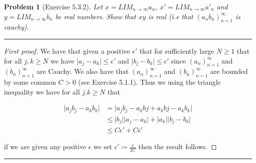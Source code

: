 \documentclass{article}
\newcommand{\lined}{\noindent\rule{\textwidth}{1pt}}
\newtheorem*{problem}{Problem}
\begin{document}
	\newpage
	
	\begin{problem}[Exercise 5.3.2]
		Let $x = LIM_{n \rightarrow \infty} a_n$, $x' = LIM_{n \rightarrow \infty} a'_n$ and $y = LIM_{n \rightarrow \infty} b_n$ be real numbers. Show that $xy$ is real (i.e that $(a_{n}b_{n})_{n = 1}^{\infty}$ is cauchy).
	\end{problem}
	
	\lined
		\begin{proof}[First proof]
			We have that given a positive $\epsilon'$ that for sufficiently large $N \geq 1$ that for all $j,k \geq N$ we have $\lvert a_j - a_k \rvert \leq \epsilon'$ and $\lvert b_j - b_k \rvert \leq \epsilon'$ since 
$(a_n)_{n = 1}^{\infty}$ and $(b_n)_{n = 1}^{\infty}$ are Cauchy. We also have that $(a_n)_{n = 1}^{\infty}$ and $(b_n)_{n = 1}^{\infty}$  are bounded by some common  $C > 0$ (see Exercise 5.1.1). Thus we using the triangle inequality we have for all $j.k \geq N$ that 

\begin{align*}
	\lvert a_{j}b_{j} -  a_{k}b_{k} \rvert & = \lvert a_{j}b_{j} - a_{k}b{j} + a_{k}b{j} -  a_{k}b_{k} \rvert \\ & \leq
	 \lvert b_j \rvert \lvert a_j - a_k \rvert + \lvert a_k \rvert\lvert b_j - b_k \rvert \\ & \leq C\epsilon' + C\epsilon'
\end{align*}

\noindent if we are given any positive $\epsilon$ we set $\epsilon' \coloneqq \frac{\epsilon}{2C}$ then the result follows. 
		\end{proof}
	\lined
	
\end{document}

